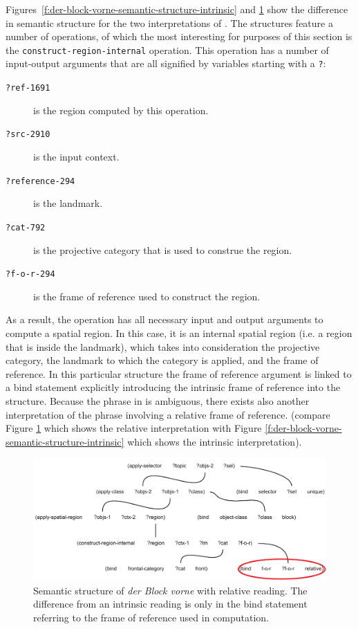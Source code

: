 Figures~\ref{f:der-block-vorne-semantic-structure-intrinsic} 
and \ref{f:der-block-vorne-semantic-structure-relative} show the difference in semantic
structure for the two interpretations of . 
The structures feature a number of operations, of which the most interesting for purposes 
of this section is the {\footnotesize\tt construct-region-internal} operation. 
This operation has a number of input-output arguments that are all signified
by variables starting with a {\footnotesize\tt ?}:
\begin{description}
\item[{\footnotesize\tt ?ref-1691}] is the region computed by this operation.
\item[{\footnotesize\tt ?src-2910}] is the input context.
\item[{\footnotesize\tt ?reference-294}] is the landmark. 
\item[{\footnotesize\tt ?cat-792}] is the projective category that is used to construe the region.
\item[{\footnotesize\tt ?f-o-r-294}] is the frame of reference used to construct the region.
\end{description}
As a result, the operation has all necessary input and output arguments to compute 
a spatial region. In this case, it is an internal spatial region (i.e. a region that 
is inside the landmark), which takes into consideration the projective
category, the landmark to which the category is applied, and the frame of reference.
In this particular structure the frame of reference argument is linked to a bind 
statement explicitly introducing the intrinsic frame of reference into the structure. 
Because the phrase in  is ambiguous, there exists 
also another interpretation of the phrase involving a relative frame of reference. 
(compare Figure \ref{f:der-block-vorne-semantic-structure-relative} which shows
the relative interpretation with Figure \ref{f:der-block-vorne-semantic-structure-intrinsic} 
which shows the intrinsic interpretation).

\begin{figure}
\begin{center}
\includegraphics[width=.8\columnwidth]{figs/der-block-vorne-semantic-structure-relative}
\caption[Semantic structure of \textit{der Block vorne} (`the block in front') -- relative]{%
Semantic structure of \textit{der Block vorne} with relative reading. The 
difference from an intrinsic reading is only in the bind statement referring 
to the frame of reference used in computation.}
\label{f:der-block-vorne-semantic-structure-relative}
\end{center}
\end{figure}

